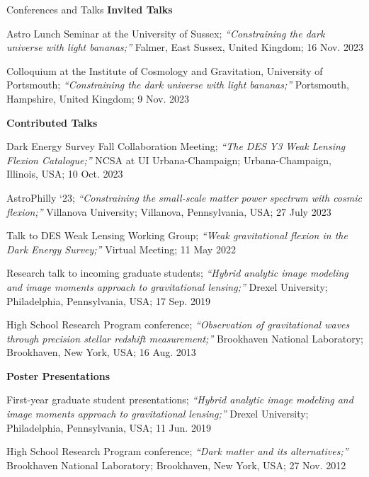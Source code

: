 \documentclass{resume} %
\begin{document}
\begin{rSection}{Conferences and Talks}
\textbf{Invited Talks}
\begin{etaremune}
\item Astro Lunch Seminar at the University of Sussex; \textit{``Constraining the dark universe with light bananas;''} Falmer, East Sussex, United Kingdom; 16 Nov. 2023
\item Colloquium at the Institute of Cosmology and Gravitation, University of Portsmouth; \textit{``Constraining the dark universe with light bananas;''} Portsmouth, Hampshire, United Kingdom; 9 Nov. 2023
\end{etaremune}

\textbf{Contributed Talks}
\begin{etaremune}
\item Dark Energy Survey Fall Collaboration Meeting; \textit{ ``The DES Y3 Weak Lensing Flexion Catalogue;''} NCSA at UI Urbana-Champaign; Urbana-Champaign, Illinois, USA; 10 Oct. 2023
\item AstroPhilly `23; \textit{``Constraining the small-scale matter power spectrum with cosmic flexion;''} Villanova University; Villanova, Pennsylvania, USA; 27 July 2023
\item Talk to DES Weak Lensing Working Group; \textit{``Weak gravitational flexion in the Dark Energy Survey;''} Virtual Meeting; 11 May 2022
\item Research talk to incoming graduate students; \textit{``Hybrid analytic image modeling and image moments approach to gravitational lensing;''} Drexel University; Philadelphia, Pennsylvania, USA; 17 Sep. 2019
 \item  High School Research Program conference; \textit{``Observation of gravitational waves through precision stellar redshift measurement;''} Brookhaven National Laboratory; Brookhaven, New York, USA;  16 Aug. 2013
\end{etaremune}

\textbf{Poster Presentations}
\begin{etaremune}
\item  First-year graduate student presentations; \textit{``Hybrid analytic image modeling and image moments approach to gravitational lensing;''} Drexel University; Philadelphia, Pennsylvania, USA; 11 Jun. 2019
\item High School Research Program conference; \textit{``Dark matter and its alternatives;''} Brookhaven National Laboratory; Brookhaven, New York, USA; 27 Nov. 2012
\end{etaremune}
  
\end{rSection}
\end{document}
